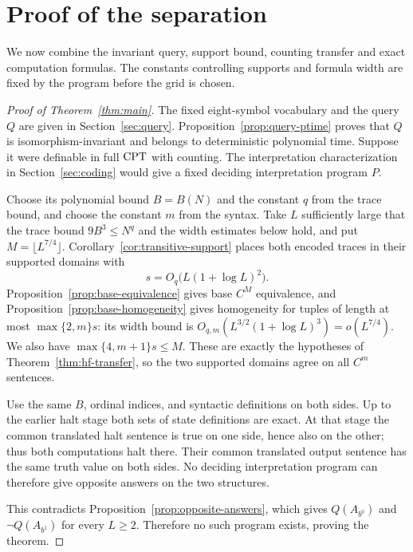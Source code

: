 \section{Proof of the separation}\label{sec:separation}

We now combine the invariant query, support bound, counting transfer and
exact computation formulas. The constants controlling supports and formula
width are fixed by the program before the grid is chosen.

\begin{proof}[Proof of Theorem~\ref{thm:main}]
The fixed eight-symbol vocabulary and the query $Q$ are given in
Section~\ref{sec:query}. Proposition~\ref{prop:query-ptime} proves that $Q$
is isomorphism-invariant and belongs to deterministic polynomial time.
Suppose it were definable in full $\mathrm{CPT}$ with counting. The interpretation
characterization in Section~\ref{sec:coding} would give a fixed deciding
interpretation program $P$.

Choose its polynomial bound $B=B(N)$ and the constant $q$
from the trace bound, and choose the constant $m$ from the syntax.
Take $L$ sufficiently large that the trace bound $9B^3\le N^q$ and
the width estimates below hold, and put $M=\lfloor L^{7/4}\rfloor$.
Corollary~\ref{cor:transitive-support} places both encoded traces in
their supported domains with
\[
 s=O_q\bigl(L(1+\log L)^2\bigr).
\]
Proposition~\ref{prop:base-equivalence}
gives base $C^M$ equivalence, and
Proposition~\ref{prop:base-homogeneity} gives homogeneity for tuples of
length at most $\max\{2,m\}s$: its width bound is
$O_{q,m}(L^{3/2}(1+\log L)^3)=o(L^{7/4})$.
We also have $\max\{4,m+1\}s\le M$.
These are exactly the hypotheses of Theorem~\ref{thm:hf-transfer}, so the
two supported domains agree on all $C^m$ sentences.

Use the same $B$, ordinal indices, and syntactic definitions on both
sides. Up to the earlier halt stage both sets of state definitions are
exact. At that stage the common translated halt sentence is true on
one side, hence also on the other; thus both computations halt there.
Their common translated output sentence has the same truth value on
both sides. No deciding interpretation program can therefore give
opposite answers on the two structures.

This contradicts Proposition~\ref{prop:opposite-answers}, which gives
$Q(A_{b^0})$ and $\neg Q(A_{b^1})$ for every $L\ge2$. Therefore no such
program exists, proving the theorem.
\end{proof}

